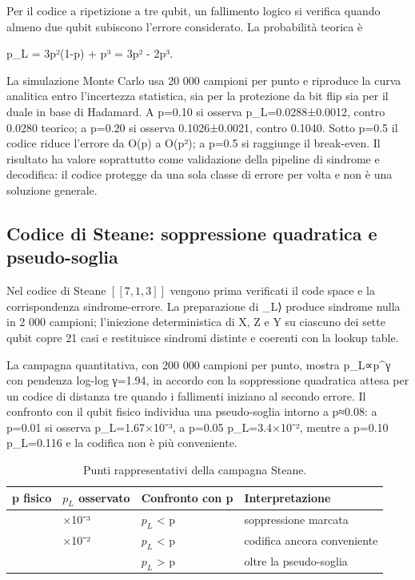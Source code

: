 Per il codice a ripetizione a tre qubit, un fallimento logico si verifica quando almeno due qubit subiscono l'errore considerato. La probabilità teorica è

p\_L = 3p²(1-p) + p³ = 3p² - 2p³.

La simulazione Monte Carlo usa 20 000 campioni per punto e riproduce la curva analitica entro l'incertezza statistica, sia per la protezione da bit flip sia per il duale in base di Hadamard. A p=0.10 si osserva p\_L=0.0288±0.0012, contro 0.0280 teorico; a p=0.20 si osserva 0.1026±0.0021, contro 0.1040. Sotto p=0.5 il codice riduce l'errore da O(p) a O(p²); a p=0.5 si raggiunge il break-even. Il risultato ha valore soprattutto come validazione della pipeline di sindrome e decodifica: il codice protegge da una sola classe di errore per volta e non è una soluzione generale.

\subsection{Codice di Steane: soppressione quadratica e pseudo-soglia}\label{sec:finale_5_2_2}\label{sec:steane}

Nel codice di Steane \ensuremath{[[7,1,3]]} vengono prima verificati il code space e la corrispondenza sindrome-errore. La preparazione di \_L⟩ produce sindrome nulla in 2 000 campioni; l'iniezione deterministica di X, Z e Y su ciascuno dei sette qubit copre 21 casi e restituisce sindromi distinte e coerenti con la lookup table.

La campagna quantitativa, con 200 000 campioni per punto, mostra p\_L∝p\^{}γ con pendenza log-log γ=1.94, in accordo con la soppressione quadratica attesa per un codice di distanza tre quando i fallimenti iniziano al secondo errore. Il confronto con il qubit fisico individua una pseudo-soglia intorno a p≈0.08: a p=0.01 si osserva p\_L=1.67×10⁻³, a p=0.05 p\_L=3.4×10⁻², mentre a p=0.10 p\_L=0.116 e la codifica non è più conveniente.

\begingroup
\small
\begin{table}[!htbp]
\centering
\small

\begin{tabular}{@{}
  >{\raggedright\arraybackslash}p{}
  >{\centering\arraybackslash}p{}
  >{\centering\arraybackslash}p{}
  >{\centering\arraybackslash}p{}@{}}
\toprule
\textbf{p fisico} & \textbf{$p_L$ osservato} & \textbf{Confronto con p} & \textbf{Interpretazione} \\
\midrule
0.01 & 1.67×10⁻³ & $p_L$ \textless{} p & soppressione marcata \\
\addlinespace[0.3em]
0.05 & 3.4×10⁻² & $p_L$ \textless{} p & codifica ancora conveniente \\
\addlinespace[0.3em]
0.10 & 0.116 & $p_L$ \textgreater{} p & oltre la pseudo-soglia \\
\bottomrule
\end{tabular}
\caption{Punti rappresentativi della campagna Steane.}\label{tab:finale_5_8}

\end{table}
\endgroup

